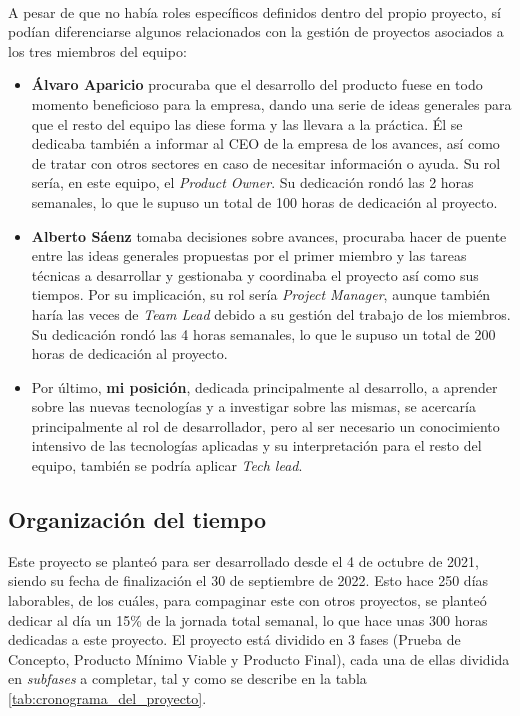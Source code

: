 \documentclass{subfiles}
\begin{document}
        \paragraph{}
        A pesar de que no había roles específicos definidos dentro del propio proyecto, sí podían diferenciarse algunos relacionados con la gestión de proyectos asociados a los tres miembros del equipo:
        \begin{itemize}
            \item \textbf{Álvaro Aparicio} procuraba que el desarrollo del producto fuese en todo momento beneficioso para la empresa, dando una serie de ideas generales para que el resto del equipo las diese forma y las llevara a la práctica. Él se dedicaba también a informar al CEO de la empresa de los avances, así como de tratar con otros sectores en caso de necesitar información o ayuda. Su rol sería, en este equipo, el \textit{Product Owner}. Su dedicación rondó las 2 horas semanales, lo que le supuso un total de 100 horas de dedicación al proyecto.
            
            \item \textbf{Alberto Sáenz} tomaba decisiones sobre avances, procuraba hacer de puente entre las ideas generales propuestas por el primer miembro y las tareas técnicas a desarrollar y gestionaba y coordinaba el proyecto así como sus tiempos. Por su implicación, su rol sería \textit{Project Manager}, aunque también haría las veces de \textit{Team Lead} debido a su gestión del trabajo de los miembros. Su dedicación rondó las 4 horas semanales, lo que le supuso un total de 200 horas de dedicación al proyecto.
            
            \item Por último, \textbf{mi posición}, dedicada principalmente al desarrollo, a aprender sobre las nuevas tecnologías y a investigar sobre las mismas, se acercaría principalmente al rol de desarrollador, pero al ser necesario un conocimiento intensivo de las tecnologías aplicadas y su interpretación para el resto del equipo, también se podría aplicar \textit{Tech lead}.
        \end{itemize}

        \subsection{Organización del tiempo}
        \label{sec:organizacion_del_tiempo}

        Este proyecto se planteó para ser desarrollado desde el 4 de octubre de 2021, siendo su fecha de finalización el 30 de septiembre de 2022. Esto hace 250 días laborables, de los cuáles, para compaginar este con otros proyectos, se planteó dedicar al día un 15\% de la jornada total semanal, lo que hace unas 300 horas dedicadas a este proyecto. El proyecto está dividido en 3 fases (Prueba de Concepto, Producto Mínimo Viable y Producto Final), cada una de ellas dividida en \textit{subfases} a completar, tal y como se describe en la tabla \ref{tab:cronograma_del_proyecto}.
\end{document}
